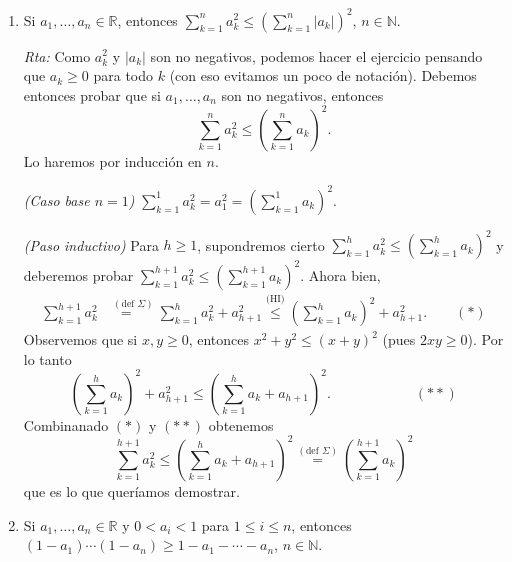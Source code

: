 \documentclass[a4paper,12pt,twoside,spanish,reqno]{amsbook}
\numberwithin{equation}{section}
\newcommand{\rta}{\noindent\textit{Rta: }}
\begin{document}
\begin{enumerate}
\begin{enumerate}
            
            \item Si $a_1,\dots,a_n \in \mathbb R$, entonces $\displaystyle{\sum_{k=1}^n a_{k}^{2}\leq \left(\sum_{k=1}^n |a_{k}|\right)^{2}}$, $n\in \mathbb N$.
            
            \rta Como $a_k^2$ y $|a_k|$ son no negativos, podemos hacer el ejercicio pensando que $a_k \ge 0$ para todo $k$ (con eso evitamos un poco de notación). Debemos entonces probar que  si $a_1,\dots,a_n $ son no negativos, entonces
            \begin{equation*}
                \sum_{k=1}^n a_{k}^{2}\leq \left(\sum_{k=1}^n a_{k}\right)^{2}. 
            \end{equation*} 
            Lo haremos por inducción en $n$.
             
            \textit{(Caso base $n=1$) } $\sum_{k=1}^1 a_{k}^{2} = a_1^2 = (\sum_{k=1}^1 a_{k})^{2}$.
            
            \textit{(Paso inductivo) }  Para  $h \ge 1$,  supondremos cierto $\sum_{k=1}^h a_{k}^{2}\leq \left(\sum_{k=1}^h a_{k}\right)^{2}$ y deberemos  probar $\sum_{k=1}^{h+1} a_{k}^{2}\leq \left(\sum_{k=1}^{h+1} a_{k}\right)^{2}$.  Ahora bien,
            \begin{align*}
            \sum_{k=1}^{h+1} a_{k}^{2} &\overset{(\text{def } \Sigma)}{=\quad} \sum_{k=1}^h a_{k}^{2} + a_{h+1}^{2} \overset{\text{(HI)}}{\leq} \left(\sum_{k=1}^h a_{k}\right)^{2} + a_{h+1}^{2}. \qquad (*)
            \end{align*}
            Observemos que si $x,y \ge 0$,  entonces $x^2 + y^2 \leq (x+y)^2$ (pues $2xy \ge 0$). Por lo tanto 
            \begin{equation*}
                 \left(\sum_{k=1}^h a_{k}\right)^{2} + a_{h+1}^{2} \leq  \left(\sum_{k=1}^h a_{k}+a_{h+1}\right)^{2}. \qquad\qquad\qquad (**)
            \end{equation*}
            Combinanado $(*)$ y $(**)$ obtenemos
            \begin{equation*}
                \sum_{k=1}^{h+1} a_{k}^{2} \leq \left(\sum_{k=1}^h a_{k}+a_{h+1}\right)^{2} \overset{(\text{def } \Sigma)}{=} \left(\sum_{k=1}^{h+1} a_{k}\right)^{2}
            \end{equation*}
            que es lo que queríamos demostrar. 
            
            \item Si $a_1,\dots,a_n \in \mathbb R$ y $0<a_i<1$ para $1 \le i\le n$, entonces $(1-a_1)\cdots(1-a_n)\ge 1-a_1-\cdots -a_n$, $n\in \mathbb N$.
            

\end{enumerate}
\end{enumerate}
\end{document}

